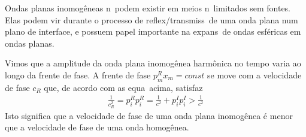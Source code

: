 Ondas planas inomog\^eneas n\ao\ podem existir em meios n\ao\ limitados
sem fontes. Elas podem vir durante o processo de reflex\ao/transmiss\ao\
de uma onda plana num plano de interface, e possuem papel importante na
expans\ao\ de ondas esf\'ericas em ondas planas.

Vimos que a amplitude da onda plana inomog\^enea harm\^onica no tempo varia ao longo da frente de fase.
A frente de fase $p_{m}^{R}x_m = const$ se move com a velocidade de fase $c_R$ que, de acordo com as 
equa\coes\ acima, satisfaz
\begin{eqnarray}
\frac{1}{c_R^2} = p_i^R p_i^R = \frac{1}{c^2} + p_i^I p_i^I > \frac{1}{c^2}
\end{eqnarray} 
Isto significa que a velocidade de fase de uma onda plana inomog\^enea \'e menor que a velocidade de fase 
de uma onda homog\^enea.
